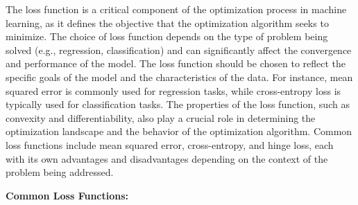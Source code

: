 \documentclass[
  letterpaper,
  DIV=11,
  numbers=noendperiod]{scrreprt}
\begin{document}
The loss function is a critical component of the optimization process in
machine learning, as it defines the objective that the optimization
algorithm seeks to minimize. The choice of loss function depends on the
type of problem being solved (e.g., regression, classification) and can
significantly affect the convergence and performance of the model. The
loss function should be chosen to reflect the specific goals of the
model and the characteristics of the data. For instance, mean squared
error is commonly used for regression tasks, while cross-entropy loss is
typically used for classification tasks. The properties of the loss
function, such as convexity and differentiability, also play a crucial
role in determining the optimization landscape and the behavior of the
optimization algorithm. Common loss functions include mean squared
error, cross-entropy, and hinge loss, each with its own advantages and
disadvantages depending on the context of the problem being addressed.

\textbf{Common Loss Functions:}
\end{document}
